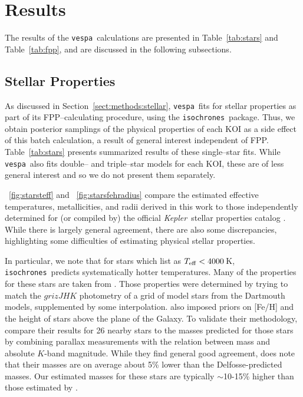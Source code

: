 \documentclass{emulateapj}
\newcommand{\figref}[1]{\ref{fig:#1}}
\newcommand{\Fig}[1]{\figurename~\figref{#1}}
\newcommand{\fig}[1]{\Fig{#1}}
\newcommand{\Tab}[1]{Table~\ref{tab:#1}}
\newcommand{\tab}[1]{\Tab{#1}}
\newcommand{\sectionname}{Section}
\newcommand{\Sect}[1]{\sectionname~\ref{sect:#1}}
\newcommand{\sect}[1]{\Sect{#1}}
\newcommand{\sectlabel}[1]{\label{sect:#1}}
\newcommand{\kepler}{\textit{Kepler}}
\newcommand{\vespa}{\texttt{vespa}}
\newcommand{\isochrones}{\texttt{isochrones}}
\begin{document}



\section{Results}
\sectlabel{results}

The results of the \vespa\ calculations are presented in
\tab{stars} and \tab{fpp}, and are discussed in
the following subsections.  



\subsection{Stellar Properties}
\sectlabel{results:stars}

As discussed in \sect{methods:stellar}, \vespa\ fits for stellar
properties as part of its FPP--calculating procedure, using the
\isochrones\ package.  Thus, we obtain posterior samplings of the
physical properties of each KOI as a side effect of this batch
calculation, a result of general interest independent of FPP.
\tab{stars} presents summarized results of these single--star
fits.  While \vespa\ also fits double-- and triple--star models for
each KOI, these are of less general interest and so we do not
present them separately.

\fig{starsteff} and \fig{starsfehradius} compare the estimated
effective temperatures, metallicities, and radii derived in this work
to those independently determined for (or compiled by) the official
\kepler\ stellar properties catalog \citep[][hereafter
  ]{Huber:2014}.  While there is largely
general agreement, there are also some discrepancies, highlighting some
difficulties of estimating physical stellar properties.

In particular, we note that for stars which 
list as $T_{\rm eff} < 4000$\,K, \isochrones\ predicts systematically
hotter temperatures.  Many of the  properties
for these stars are taken from
\citet[][]{Dressing:2013}.  Those properties
were determined by trying to match the $grizJHK$ photometry
of a grid of model stars from the Dartmouth models, supplemented by
some interpolation.   also imposed priors
on [Fe/H] and the height of stars above the plane of the Galaxy.  To
validate their methodology,  compare their
results for 26 nearby stars to the masses predicted for those stars by
combining parallax measurements with the \citet{Delfosse:2000}
relation between mass and absolute $K$-band magnitude.  While they
find general good agreement,  does note that
their masses are on average about 5\% lower than the Delfosse-predicted
masses.  Our estimated masses for these stars are typically
$\sim$10-15\% higher than those estimated by .
\end{document}
